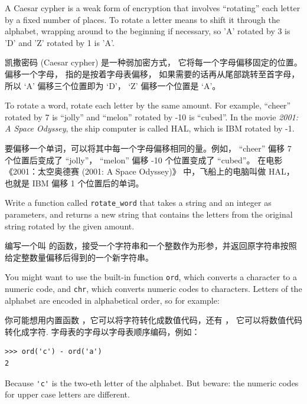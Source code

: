 \begin{exercise}
  

\label{exrotate}
A Caesar cypher is a weak form of encryption that involves ``rotating'' each
letter by a fixed number of places.  To rotate a letter means
to shift it through the alphabet, wrapping around to the beginning if
necessary, so 'A' rotated by 3 is 'D' and 'Z' rotated by 1 is 'A'.

凯撒密码 (Caesar cypher) 是一种弱加密方式， 它将每一个字母偏移固定的位置。 偏移一个字母， 指的是按着字母表偏移， 如果需要的话再从尾部跳转至首字母， 所以 `A' 偏移三个位置即为 `D'， `Z' 偏移一个位置是 `A'。

To rotate a word, rotate each letter by the same amount.
For example, ``cheer'' rotated by 7 is ``jolly'' and ``melon'' rotated
by -10 is ``cubed''.  In the movie {\em 2001: A Space Odyssey}, the
ship computer is called HAL, which is IBM rotated by -1.

要偏移一个单词，可以将其中每一个字母偏移相同的量。例如， ``cheer'' 偏移 7 个位置后变成了 ``jolly''， ``melon'' 偏移 -10 个位置变成了 ``cubed''。 在电影 《2001：太空奥德赛 (2001: A Space Odyssey)》 中，飞船上的电脑叫做 HAL，也就是 IBM 偏移 1 个位置后的单词。


Write a function called \verb"rotate_word"
that takes a string and an integer as parameters, and returns
a new string that contains the letters from the original string
rotated by the given amount.

编写一个叫  的函数，接受一个字符串和一个整数作为形参，并返回原字符串按照给定整数量偏移后得到的一个新字符串。

You might want to use the built-in function {\tt ord}, which converts
a character to a numeric code, and {\tt chr}, which converts numeric
codes to characters.  Letters of the alphabet are encoded in alphabetical
order, so for example:

你可能想用内置函数  ，它可以将字符转化成数值代码，还有 ， 它可以将数值代码转化成字符. 字母表的字母以字母表顺序编码，例如：

\begin{lstlisting}
>>> ord('c') - ord('a')
2
\end{lstlisting}

Because \verb"'c'" is the two-eth letter of the alphabet.  But
beware: the numeric codes for upper case letters are different.


\end{exercise}
